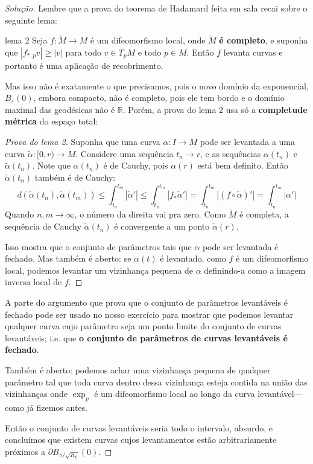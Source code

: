 \begin{proof}[Solução]
Lembre que a prova do teorema de Hadamard feita em sala recai sobre o seguinte lema:
\begin{thing7}{lema 2}\leavevmode
Seja \(f:\tilde{M} \to M\) é um difeomorfismo local, onde \(\tilde{M}\) \textbf{é completo}, e suponha que \(|f_{*,p} v|\geq |v|\) para todo \(v \in T_pM\) e todo \(p \in M\). Então \(f\) levanta curvas e portanto é uma aplicação de recobrimento.
\end{thing7}
Mas isso não é exatamente o que precisamos, pois o novo domínio da exponencial, \(B_\varepsilon(0)\), embora compacto, não é completo, pois ele tem bordo e o domínio maximal das geodésicas não é \(\mathbb{R}\). Porém, a prova do lema 2 usa só a \textbf{completude métrica} do espaço total:
\begin{proof}[Prova do lema 2]\leavevmode
Suponha que uma curva \(\alpha:I \to M\) pode ser levantada a uma curva \(\tilde{\alpha}:[0,r) \to \tilde{M}\). Considere uma sequência \(t_n \to r\), e as sequências \(\alpha(t_n)\) e \(\tilde{\alpha}(t_n)\). Note que \(\alpha(t_n)\) é de Cauchy, pois \(\alpha(r)\) está bem definito. Então \(\tilde{\alpha}(t_n)\) também é de Cauchy:
\[d(\tilde{\alpha}(t_n),\tilde{\alpha}(t_m))\leq \int_{t_n}^{t_m} |\tilde{\alpha}'|\leq \int_{t_n}^{t_m}|f_*\tilde{\alpha}'|=\int_{t_n}^{t_m}|(f \circ\tilde{\alpha})'|=\int_{t_n}^{t_m}|\alpha'|\]
Quando \(n,m \to \infty\), o número da direita vai pra zero. Como \(\tilde{M}\) é completa, a sequência de Cauchy \(\tilde{\alpha}(t_n)\) é convergente a um ponto \(\tilde{\alpha}(r)\).

Isso mostra que o conjunto de parâmetros tais que \(\alpha\) pode ser levantada é fechado. Mas também é aberto: se \(\alpha(t)\) é levantado, como \(f\) é um difeomorfismo local, podemos levantar um vizinhança pequena de \(\alpha\) definindo-a como a imagem inversa local de \(f\).
\end{proof}
A parte do argumento que prova que o conjunto de parâmetros levantáveis é fechado pode ser usado no nosso exercício para mostrar que podemos levantar qualquer curva cujo parâmetro seja um ponto limite do conjunto de curvas levantáveis; i.e. que \textbf{o conjunto de parâmetros de curvas levantáveis é fechado}.

Também é aberto: podemos achar uma vizinhança pequena de qualquer parâmetro tal que toda curva dentro dessa vizinhança esteja contida na união das vizinhanças onde \(\operatorname{exp}_p\) é um difeomorfismo local ao longo da curva levantável---como já fizemos antes.

Então o conjunto de curvas levantáveis seria todo o intervalo, absurdo, e concluímos que existem curvas cujos levantamentos estão arbitrariamente próximos a \(\partial B_{\pi/\sqrt{K_0}}(0)\).


\end{proof}
